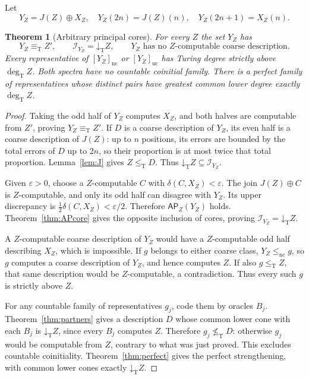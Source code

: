 \documentclass[11pt,a4paper]{article}
\newcommand{\leT}{\leq_{\mathrm T}}
\newcommand{\nleT}{\nleq_{\mathrm T}}
\newcommand{\eqT}{\equiv_{\mathrm T}}
\newcommand{\degT}{\operatorname{deg}_{\mathrm T}}
\newcommand{\nc}{\mathrm{nc}}
\newcommand{\uc}{\mathrm{uc}}
\newcommand{\core}{\mathcal I}
\newcommand{\low}[1]{\mathord\downarrow_{\!\mathrm T}#1}
\newcommand{\AP}{\mathsf{AP}}
\newtheorem{theorem}{Theorem}[section]
\theoremstyle{definition}\newtheorem{definition}[theorem]{Definition}
\theoremstyle{remark}\newtheorem{remark}[theorem]{Remark}
\begin{document}
Let
\begin{equation}\label{eq:Y}
 Y_Z=J(Z)\oplus X_Z,
 \quad Y_Z(2n)=J(Z)(n),\quad Y_Z(2n+1)=X_Z(n).
\end{equation}

\begin{theorem}[Arbitrary principal cores]\label{thm:relative}
For every $Z$ the set $Y_Z$ has
\[
 Y_Z\eqT Z',\qquad \core_{Y_Z}=\low Z,
 \qquad Y_Z\text{ has no }Z\text{-computable coarse description}.
\]
Every representative of $[Y_Z]_{\nc}$ or $[Y_Z]_{\uc}$ has Turing degree
strictly above $\degT Z$. Both spectra have no countable coinitial family.
There is a perfect family of representatives whose distinct pairs have
greatest common lower degree exactly $\degT Z$.
\end{theorem}
\begin{proof}
Taking the odd half of $Y_Z$ computes $X_Z$, and both halves are computable
from $Z'$, proving $Y_Z\eqT Z'$. If $D$ is a coarse description of $Y_Z$,
its even half is a coarse description of $J(Z)$: up to $n$ positions, its
errors are bounded by the total errors of $D$ up to $2n$, so their proportion
is at most twice that total proportion. Lemma~\ref{lem:J} gives $Z\leT D$.
Thus $\low Z\subseteq\core_{Y_Z}$.

Given $\varepsilon>0$, choose a $Z$-computable $C$ with
$\delta(C,X_Z)<\varepsilon$. The join $J(Z)\oplus C$ is $Z$-computable, and
only its odd half can disagree with $Y_Z$. Its upper discrepancy is
$\tfrac12\delta(C,X_Z)<\varepsilon/2$. Therefore $\AP_Z(Y_Z)$ holds.
Theorem~\ref{thm:APcore} gives the opposite inclusion of cores, proving
$\core_{Y_Z}=\low Z$.

A $Z$-computable coarse description of $Y_Z$ would have a $Z$-computable odd
half describing $X_Z$, which is impossible. If $g$ belongs to either coarse
class, $Y_Z\le_{\nc}g$, so $g$ computes a coarse description of $Y_Z$, and
hence computes $Z$. If also $g\leT Z$, that same description would be
$Z$-computable, a contradiction. Thus every such $g$ is strictly above $Z$.

For any countable family of representatives $g_j$, code them by oracles
$B_j$. Theorem~\ref{thm:partners} gives a description $D$ whose common lower
cone with each $B_j$ is $\low Z$, since every $B_j$ computes $Z$. Therefore
$g_j\nleT D$: otherwise $g_j$ would be computable from $Z$, contrary to what
was just proved. This excludes countable coinitiality. Theorem~\ref{thm:perfect}
gives the perfect strengthening, with common lower cones exactly $\low Z$.
\end{proof}
\end{document}
